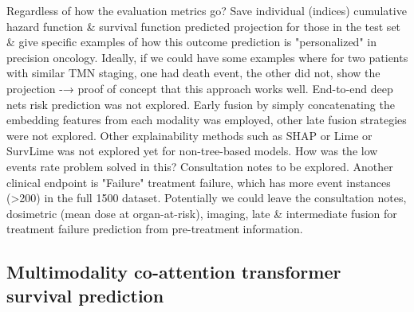 \documentclass{article}%
\begin{document}
\newline%
\newline%
%
Regardless of how the evaluation metrics go? %
\newline%
\newline%
%
Save individual (indices) cumulative hazard function \& survival function predicted projection for those in the test set \& give specific examples of how this outcome prediction is "personalized" in precision oncology.%
\newline%
\newline%
%
Ideally, if we could have some examples where for two patients with similar TMN staging, one had death event, the other did not, show the projection {-}→ proof of concept that this approach works well. %
\newline%
\newline%
%
End{-}to{-}end deep nets risk prediction was not explored.  %
\newline%
\newline%
%
Early fusion by simply concatenating the embedding features from each modality was employed, other late fusion strategies were not explored. %
\newline%
\newline%
%
Other explainability methods such as SHAP or Lime or SurvLime was not explored yet for non{-}tree{-}based models. %
\newline%
\newline%
%
How was the low events rate problem solved in this? %
\newline%
\newline%
%
Consultation notes to be explored. %
\newline%
\newline%
%
Another clinical endpoint is "Failure" treatment failure, which has more event instances (>200) in the full 1500 dataset. Potentially we could leave the consultation notes, dosimetric (mean dose at organ{-}at{-}risk), imaging, late \& intermediate fusion for treatment failure prediction from pre{-}treatment information.%
\newline%
\newline%
%
%
\newline%
\newline%
%
%
\newline%
\newline%
%
\subsection{Multimodality co{-}attention transformer survival prediction }%
\label{subsec:Multimodalityco{-}attentiontransformersurvivalprediction}%
\end{document}
